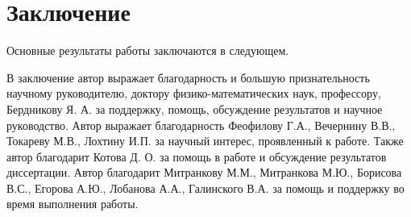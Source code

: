 \chapter*{Заключение}                       %


Основные результаты работы заключаются в следующем.



В заключение автор выражает благодарность и большую признательность научному руководителю, доктору физико-математических наук, профессору, Бердникову Я. А. за поддержку, помощь, обсуждение результатов и научное руководство. Автор выражает благодарность Феофилову Г.А., Вечернину В.В., Токареву М.В., Лохтину И.П. за научный интерес, проявленный к работе. Так­же автор благодарит Котова Д. О. за помощь в работе и обсуждение результатов диссертации. Автор благодарит Митранкову М.М., Митранкова М.Ю., Борисова В.С., Егорова А.Ю., Лобанова А.А., Галинского В.А. за помощь и поддержку во время выполнения работы.

